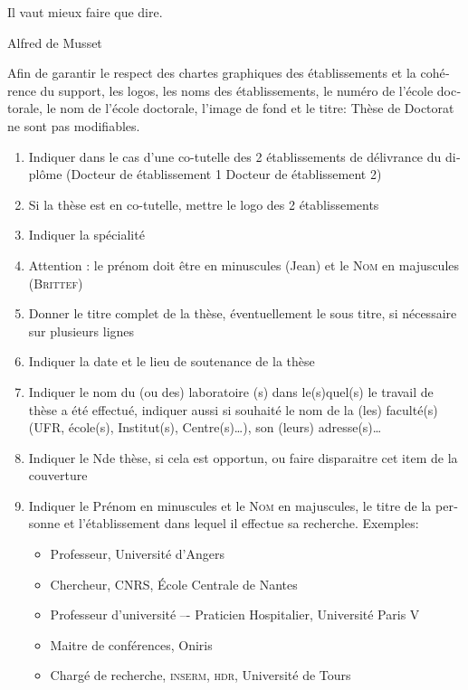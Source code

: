\begin{otherlanguage}{french}
\epigraph{Il vaut mieux faire que dire.}{Alfred de Musset}
\minitoc%
Afin de garantir le respect des chartes graphiques des établissements et la cohérence du support, les  logos, les noms des établissements, le numéro de l’école doctorale, le nom de l’école doctorale, l’image de fond et le titre: Thèse de Doctorat ne sont pas modifiables.

\begin{enumerate}[label=(\arabic*)]
	\item Indiquer dans le cas d’une co-tutelle des 2 établissements de délivrance du diplôme (Docteur de établissement 1 Docteur de établissement 2)
	\item Si la thèse est en co-tutelle, mettre le logo des 2 établissements
	\item Indiquer la spécialité
	\item Attention : le prénom doit être en minuscules (Jean) et le \textsc{Nom} en majuscules (\textsc{Brittef})
	\item Donner le titre complet de la thèse, éventuellement le sous titre, si nécessaire sur plusieurs lignes
	\item Indiquer la date et le lieu de soutenance de la thèse
	\item Indiquer le nom du (ou des) laboratoire (s) dans le(s)quel(s) le travail de thèse a été effectué, indiquer aussi si souhaité le nom de la (les) faculté(s) (UFR, école(s), Institut(s), Centre(s)\ldots), son 	(leurs) adresse(s)\ldots
	\item Indiquer le N\textordmasculine de thèse, si cela est opportun, ou faire disparaitre cet item de la couverture
	\item Indiquer le Prénom en minuscules et le \textsc{Nom} en majuscules, le titre de la personne et
	l’établissement dans lequel il effectue sa recherche. Exemples:
	\begin{itemize}
		\item Professeur, Université d’Angers
		\item Chercheur, CNRS, École Centrale de Nantes
		\item Professeur d’université –- Praticien Hospitalier, Université Paris V
		\item Maitre de conférences, Oniris
		\item Chargé de recherche, \textsc{inserm}, \textsc{hdr}, Université de Tours
	\end{itemize}
\end{enumerate}


\end{otherlanguage}
